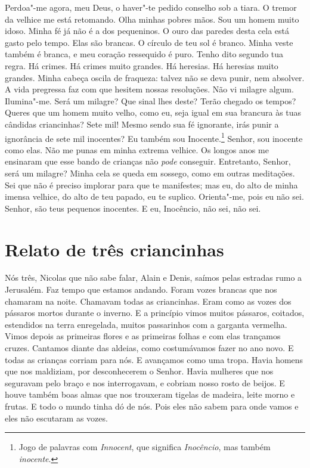 Perdoa"-me agora, meu Deus, o haver"-te pedido conselho sob a tiara. O tremor
da velhice me está retomando. Olha minhas pobres mãos. Sou um homem muito
idoso. Minha fé já não é a dos pequeninos. O ouro das paredes desta cela
está gasto pelo tempo. Elas são brancas. O círculo de teu sol é branco.
Minha veste também é branca, e meu coração ressequido é puro. Tenho dito
segundo tua regra. Há crimes. Há crimes muito grandes. Há heresias. Há
heresias muito grandes. Minha cabeça oscila de fraqueza: talvez não se
deva punir, nem absolver. A vida pregressa faz com que hesitem nossas
resoluções. Não vi milagre algum. Ilumina"-me. Será um milagre? Que sinal
lhes deste? Terão chegado os tempos? Queres que um homem muito velho, como
eu, seja igual em sua brancura às tuas cândidas criancinhas? Sete mil!
Mesmo sendo sua fé ignorante, irás punir a ignorância de sete mil
inocentes? Eu também sou Inocente.\footnote{ Jogo de
palavras com \textit{Innocent}, que significa \textit{Inocêncio}, mas
também \textit{inocente}.}  Senhor, sou inocente como elas. Não
me punas em minha extrema velhice. Os longos anos me ensinaram que esse
bando de crianças não \textit{pode} conseguir. Entretanto, Senhor, será um
milagre? Minha cela se queda em sossego, como em outras meditações. Sei
que não é preciso implorar para que te manifestes; mas eu, do alto de
minha imensa velhice, do alto de teu papado, eu te suplico. Orienta"-me,
pois eu não sei. Senhor, são teus pequenos inocentes. E eu, Inocêncio, não
sei, não sei.

\chapter{Relato de três criancinhas}

Nós três, Nicolas que não sabe falar, Alain e Denis, saímos pelas estradas
rumo a Jerusalém. Faz tempo que estamos andando. Foram vozes brancas que
nos chamaram na noite. Chamavam todas as criancinhas. Eram como as vozes
dos pássaros mortos durante o inverno. E a princípio vimos muitos
pássaros, coitados, estendidos na terra enregelada, muitos passarinhos com
a garganta vermelha. Vimos depois as primeiras flores e as primeiras
folhas e com elas trançamos cruzes. Cantamos diante das aldeias, como
costumávamos fazer no ano novo. E todas as crianças corriam para nós. E
avançamos como uma tropa. Havia homens que nos maldiziam, por
desconhecerem o Senhor. Havia mulheres que nos seguravam pelo braço e nos
interrogavam, e cobriam nosso rosto de beijos. E houve também boas almas
que nos trouxeram tigelas de madeira, leite morno e frutas. E todo o mundo
tinha dó de nós. Pois eles não sabem para onde vamos e eles não escutaram
as vozes.

